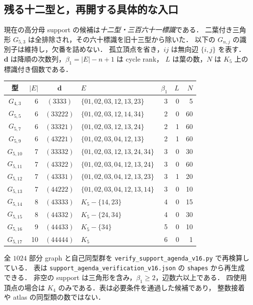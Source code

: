 \subsection{残る十二型と，再開する具体的な入口}
\label{ns16:support-agenda}

現在の高分母 support の候補は\emph{十二型・三百六十一標識}である．
二葉付き三角形 $G_{5,3}$ は全排除され，その六十標識を旧十三型から除いた．
以下の $G_{n,j}$ の識別子は維持し，欠番を詰めない．
孤立頂点を省き，$ij$ は無向辺 $\{i,j\}$ を表す．
$\mathbf d$ は降順の次数列，$\beta_1=|E|-n+1$ は cycle rank，
$L$ は葉の数，$N$ は $K_5$ 上の標識付き個数である．

\begin{center}
\footnotesize
\setlength{\tabcolsep}{3pt}
\begin{tabular}{crclrrr}
型 & $|E|$ & $\mathbf d$ & $E$ & $\beta_1$ & $L$ & $N$\\\hline
$G_{4,3}$ & 6 & $(3333)$ & $\{01,02,03,12,13,23\}$ & 3 & 0 & 5 \\
$G_{5,5}$ & 6 & $(33222)$ & $\{01,02,03,12,14,34\}$ & 2 & 0 & 60 \\
$G_{5,7}$ & 6 & $(33321)$ & $\{01,02,03,12,13,24\}$ & 2 & 1 & 60 \\
$G_{5,9}$ & 6 & $(43221)$ & $\{01,02,03,04,12,13\}$ & 2 & 1 & 60 \\
$G_{5,10}$ & 7 & $(33332)$ & $\{01,02,03,12,13,24,34\}$ & 3 & 0 & 30 \\
$G_{5,11}$ & 7 & $(43322)$ & $\{01,02,03,04,12,13,24\}$ & 3 & 0 & 60 \\
$G_{5,12}$ & 7 & $(43331)$ & $\{01,02,03,04,12,13,23\}$ & 3 & 1 & 20 \\
$G_{5,13}$ & 7 & $(44222)$ & $\{01,02,03,04,12,13,14\}$ & 3 & 0 & 10 \\
$G_{5,14}$ & 8 & $(43333)$ & $K_5-\{14,23\}$ & 4 & 0 & 15 \\
$G_{5,15}$ & 8 & $(44332)$ & $K_5-\{24,34\}$ & 4 & 0 & 30 \\
$G_{5,16}$ & 9 & $(44433)$ & $K_5-\{34\}$ & 5 & 0 & 10 \\
$G_{5,17}$ & 10 & $(44444)$ & $K_5$ & 6 & 0 & 1 \\
\end{tabular}
\end{center}

全 $1024$ 部分 graph と自己同型群を
\nolinkurl{verify_support_agenda_v16.py} で再検算している．
表は \nolinkurl{support_agenda_verification_v16.json} の \texttt{shapes} から再生成できる．
非空の support は三角形を含み，$\beta_1\ge2$，辺数六以上である．
四使用頂点の場合は $K_4$ のみである．表は必要条件を通過した候補であり，
整数接着や atlas の同型類の数ではない．

